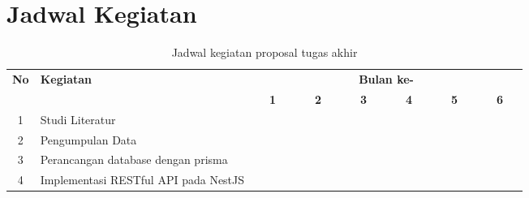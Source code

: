 \section{Jadwal Kegiatan}
\begin{table}[h!]
  \centering
    \caption{Jadwal kegiatan proposal tugas akhir}
  \label{Novella}
  \begin{tabular}{|c|m{2.5cm}|m{0.01cm}|m{0.01cm}|m{0.01cm}|m{0.01cm}|m{0.01cm}|m{0.01cm}|m{0.01cm}|m{0.01cm}|m{0.01cm}|m{0.01cm}|m{0.01cm}|m{0.01cm}|m{0.01cm}|m{0.01cm}|m{0.01cm}|m{0.01cm}|m{0.01cm}|m{0.01cm}|m{0.01cm}|m{0.01cm}|m{0.01cm}|m{0.01cm}|m{0.01cm}|m{0.01cm}|}
    \hline
    \multirow{2}{*}{\textbf{No}} & \multirow{2}{*}{\textbf{Kegiatan}} & \multicolumn{24}{|c|}{\textbf{Bulan ke-}} \\
    \hhline{~~------------------------}
    {} & {} & \multicolumn{4}{|c|}{\textbf{1}} & \multicolumn{4}{|c|}{\textbf{2}} & \multicolumn{4}{|c|}{\textbf{3}} & \multicolumn{4}{|c|}{\textbf{4}} & \multicolumn{4}{|c|}{\textbf{5}} & \multicolumn{4}{|c|}{\textbf{6}}\\
    \hline
    1 & Studi Literatur & \cellcolor{blue!25} & \cellcolor{blue!25} & \cellcolor{blue!25} & \cellcolor{blue!25}& \cellcolor{blue!25} & \cellcolor{blue!25} & \cellcolor{blue!25} & \cellcolor{blue!25}& \cellcolor{blue!25} & \cellcolor{blue!25} & \cellcolor{blue!25} & \cellcolor{blue!25}& \cellcolor{blue!25} & \cellcolor{blue!25} & \cellcolor{blue!25} & \cellcolor{blue!25}& \cellcolor{blue!25} & \cellcolor{blue!25} & \cellcolor{blue!25} & \cellcolor{blue!25}& \cellcolor{blue!25} & \cellcolor{blue!25} & \cellcolor{blue!25} & \cellcolor{blue!25}\\
    \hline
    2 & Pengumpulan Data & \cellcolor{blue!25} & \cellcolor{blue!25} & \cellcolor{blue!25} & \cellcolor{blue!25} & {} & {} & {} & {} & {} & {} & {} & {}& {} & {} & {} & {}& {} & {} & {} & {}& {} & {} & {} & {}\\
    \hline
    3 & Perancangan database dengan prisma &  {} & {} & {} & {}  & \cellcolor{blue!25} & \cellcolor{blue!25} & \cellcolor{blue!25} & \cellcolor{blue!25} & \cellcolor{blue!25} & \cellcolor{blue!25} & \cellcolor{blue!25} & \cellcolor{blue!25} & {} & {} & {} & {}& {} & {} & {} & {}& {} & {} & {} & {}\\
    \hline
    4 & Implementasi RESTful API pada NestJS &  {} & {} & {} & {} & {} & {} & {} & {}& \cellcolor{blue!25} & \cellcolor{blue!25} & \cellcolor{blue!25} & \cellcolor{blue!25} & \cellcolor{blue!25} & \cellcolor{blue!25} & \cellcolor{blue!25} & \cellcolor{blue!25} & {} & {} & {} & {}& {} & {} & {} & {}\\

\end{tabular}
\end{table}
